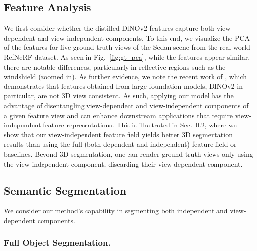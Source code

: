 



\subsection{Feature Analysis}
\label{sec:feature_analysis}




We first consider whether the distilled DINOv2 features capture both view-dependent and view-independent components. To this end, we visualize the PCA of the features for five ground-truth views of the Sedan scene from the real-world RefNeRF dataset. As seen in Fig.~\ref{fig:gt_pca}, while the features appear similar, there are notable differences, particularly in reflective regions such as the windshield (zoomed in). As further evidence, we note the recent work of \cite{el2024probing}, which demonstrates that features obtained from large foundation models, DINOv2 in particular, are not 3D view consistent. As such, applying our model has the advantage of disentangling view-dependent and view-independent components of a given feature view and can enhance downstream applications that require view-independent feature representations. This is illustrated in Sec.~\ref{sec:semantic_segmentation}, where we show that our view-independent feature field yields better 3D segmentation results than using the full (both dependent and independent) feature field or baselines.
Beyond 3D segmentation, one can render ground truth views only using the view-independent component, discarding their view-dependent component.  





\subsection{Semantic Segmentation}
\label{sec:semantic_segmentation}






We consider our method's capability in segmenting both independent and view-dependent components. 



\subsubsection{Full Object Segmentation.}

